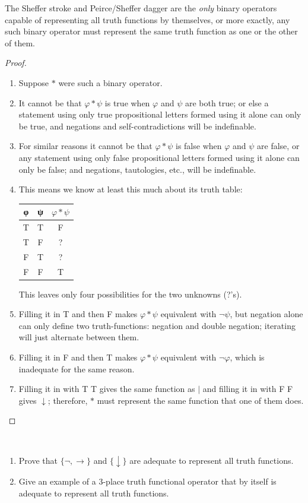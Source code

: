 \documentclass[12pt]{report}
\theoremstyle{nonumberplain}
\newtheorem{proof}{Proof}
\newcounter{hwex}
\newenvironment{hw}{\refstepcounter{hwex}\bigskip\noindent\fbox{\textsc{~Homework~\arabic{hwex}~}}\\[0.2\baselineskip]
\noindent}{}
\begin{document}
\begin{mt}
The Sheffer stroke and Peirce/Sheffer dagger are the \emph{only} binary operators capable of representing all truth functions by themselves, or more exactly, any such binary operator must represent the same truth function as one or the other of them.
\end{mt}
\begin{proof}
\begin{enumerate}
\item Suppose $*$ were such a binary operator.
\item It cannot be that $φ * ψ$ is true when $φ$ and $ψ$ are both true; or else a statement using only true propositional letters formed using it alone can only be true, and negations and self-contradictions will be indefinable.
\item For similar reasons it cannot be that $φ * ψ$ is false when $φ$ and $ψ$ are false, or any statement using only false propositional letters formed using it alone can only be false; and negations, tautologies, etc., will be indefinable.
\item This means we know at least this much about its truth table:

\medskip\noindent
\begin{tabular}{@{}ccc}
φ & ψ & $φ * ψ$\\ \hline
T & T & F\\
T & F & ?\\
F & T & ?\\
F & F & T
\end{tabular}

\medskip\noindent This leaves only four possibilities for the two unknowns (?'s).
\item Filling it in T and then F makes $φ * ψ$ equivalent with $¬ψ$, but negation alone can only define two truth-functions: negation and double negation; iterating will just alternate between them.
\item Filling it in F and then T makes $φ * ψ$ equivalent with $¬φ$, which is inadequate for the same reason.
\item Filling it in with T T gives the same function as $|$ and filling it in with F F gives $\downarrow$; therefore, $*$ must represent the same function that one of them does.
\end{enumerate}
\end{proof}

\begin{hw}
\begin{enumerate}
\item
Prove that $\{ ¬, → \}$ and $\{ \downarrow \}$ are adequate to represent all truth functions.
\item
Give an example of a 3-place truth functional operator that by itself is adequate to represent all truth functions.
\end{enumerate}
\end{hw}
\end{document}

